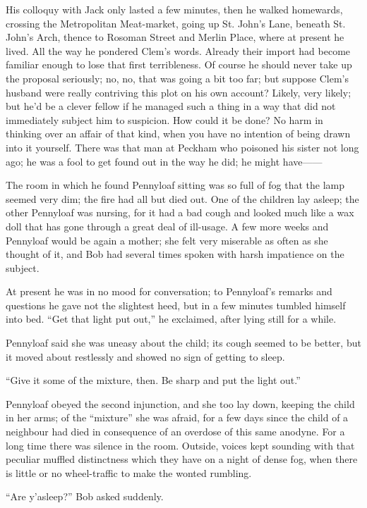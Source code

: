His colloquy with Jack only lasted a few minutes, then he walked
homewards, crossing the Metropolitan Meat-market, going up St. John's
Lane, beneath St. John's Arch, thence to Rosoman Street and Merlin
Place, where at present he lived. All the way he pondered Clem's words.
Already their import had become {}familiar enough to lose that first
terribleness. Of course he should never take up the proposal seriously;
no, no, that was going a bit too far; but suppose Clem's husband were
really contriving this plot on his own account? Likely, very likely; but
he'd be a clever fellow if he managed such a thing in a way that did not
immediately subject him to suspicion. How could it be done? No harm in
thinking over an affair of that kind, when you have no intention of
being drawn into it yourself. There was that man at Peckham who poisoned
his sister not long ago; he was a fool to get found out in the way he
did; he might {have{{------}}}

The room in which he found Pennyloaf sitting was so full of fog that the
lamp seemed very dim; the fire had all but died out. One of the children
lay asleep; the other Pennyloaf was nursing, for it had a bad cough and
looked much like a wax doll that has gone through a great deal of
ill-usage. A few more weeks and Pennyloaf would be again a mother; she
felt very miserable as often as she thought of it, and Bob had several
times spoken with harsh impatience on the subject.

At present he was in no mood for {}conversation; to Pennyloaf's remarks
and questions he gave not the slightest heed, but in a few minutes
tumbled himself into bed. ``Get that light put out,'' he exclaimed,
after lying still for a while.

Pennyloaf said she was uneasy about the child; its cough seemed to be
better, but it moved about restlessly and showed no sign of getting to
sleep.

``Give it some of the mixture, then. Be sharp and put the light out.''

Pennyloaf obeyed the second injunction, and she too lay down, keeping
the child in her arms; of the ``mixture'' she was afraid, for a few days
since the child of a neighbour had died in consequence of an overdose of
this same anodyne. For a long time there was silence in the room.
Outside, voices kept sounding with that peculiar muffled distinctness
which they have on a night of dense fog, when there is little or no
wheel-traffic to make the wonted rumbling.

``Are y'asleep?'' Bob asked suddenly.

